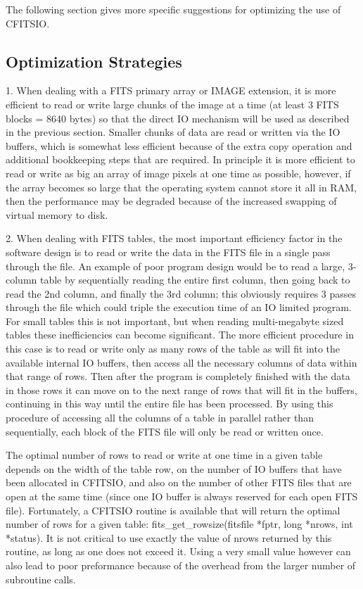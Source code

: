 The following section gives more specific suggestions for optimizing
the use of CFITSIO.


\subsection{Optimization Strategies}

1.  When dealing with a FITS primary array or IMAGE extension, it is
more efficient to read or write large chunks of the  image at a time
(at least 3 FITS blocks = 8640 bytes) so that the direct IO mechanism
will be used as described in the previous section.  Smaller chunks of
data are read or written via the IO buffers, which is somewhat less
efficient because of the extra copy operation and additional
bookkeeping steps that are required.  In principle it is more efficient
to read or write as big an array of image pixels at one time as
possible, however, if the array becomes so large that the operating
system cannot store it all in RAM, then the performance may be degraded
because of the increased swapping of virtual memory to disk.

2.  When dealing with FITS tables, the most important efficiency factor
in the software design is to read or write the data in the FITS file in
a single pass through the file.  An example of poor program design
would be to read a large, 3-column table by sequentially reading the
entire first column, then going back to read the 2nd column, and
finally the 3rd column; this obviously requires 3 passes through the
file which could triple the execution time of an IO limited program.
For small tables this is not important, but when reading multi-megabyte
sized tables these inefficiencies can become significant.  The more
efficient procedure in this case is to read or write only as many rows
of the table as will fit into the available internal IO buffers, then
access all the necessary columns of data within that range of rows.
Then after the program is completely finished with the data in those
rows it can move on to the next range of rows that will fit in the
buffers, continuing in this way until the entire file has been
processed.  By using this procedure of accessing all the columns of a
table in parallel rather than sequentially, each block of the FITS file
will only be read or written once.

The optimal number of rows to read or write at one time in a given
table depends on the width of the table row, on the number of IO
buffers that have been allocated in CFITSIO, and also on the number of
other FITS files that are open at the same time (since one IO buffer is
always reserved for each open FITS file).  Fortunately, a CFITSIO
routine is available that will return the optimal number of rows for a
given table:  fits\_get\_rowsize(fitsfile *fptr, long *nrows, int *status).
It is not critical to use exactly the value of nrows
returned by this routine, as long as one does not exceed it.  Using a
very small value however can also lead to poor preformance because of
the overhead from the larger number of subroutine calls.


